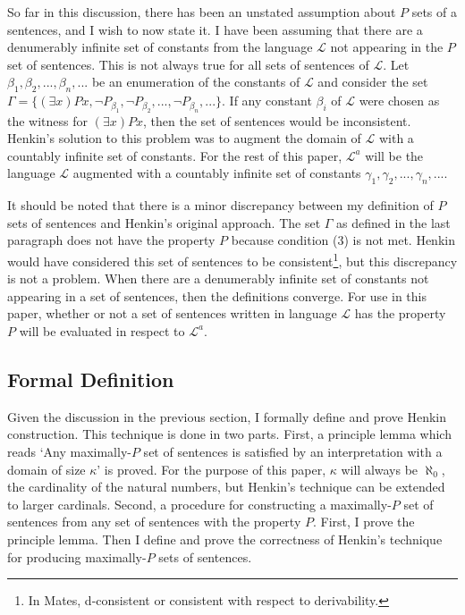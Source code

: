 \documentclass[12pt]{article}
\theoremstyle{definition}
\theoremstyle{remark}
\begin{document}
So far in this discussion, there has been an unstated assumption about $P$ sets of a sentences, and I wish to now state it. I have been assuming that there are a denumerably infinite set of constants from the language $\mathscr{L}$ not appearing in the $P$ set of sentences. This is not always true for all sets of sentences of $\mathscr{L}$. Let $\beta_1, \beta_2, ..., \beta_n, ...$ be an enumeration of the constants of $\mathscr{L}$ and consider the set $\Gamma = \{ (\exists x)Px, \neg P_{\beta_1}, \neg P_{\beta_2}, ..., \neg P_{\beta_n}, ... \}$. If any constant $\beta_i$ of $\mathscr{L}$ were chosen as the witness for $(\exists x)Px$, then the set of sentences would be inconsistent. Henkin's solution to this problem was to augment the domain of $\mathscr{L}$ with a countably infinite set of constants. For the rest of this paper, $\mathscr{L}^a$ will be the language $\mathscr{L}$ augmented with a countably infinite set of constants $\gamma_1, \gamma_2, ..., \gamma_n, ...$. 

It should be noted that there is a minor discrepancy between my definition of $P$ sets of sentences and Henkin's original approach. The set $\Gamma$ as defined in the last paragraph does not have the property $P$ because condition (3) is not met. Henkin would have considered this set of sentences to be consistent\footnote{In Mates, d-consistent or consistent with respect to derivability.}, but this discrepancy is not a problem. When there are a denumerably infinite set of constants not appearing in a set of sentences, then the definitions converge. For use in this paper, whether or not a set of sentences written in language $\mathscr{L}$ has the property $P$ will be evaluated in respect to $\mathscr{L}^a$.

\subsection{Formal Definition}

Given the discussion in the previous section, I formally define and prove Henkin construction. This technique is done in two parts. First, a principle lemma which reads `Any maximally-$P$ set of sentences is satisfied by an interpretation with a domain of size $\kappa$' is proved. For the purpose of this paper, $\kappa$ will always be $\aleph_0$, the cardinality of the natural numbers, but Henkin's technique can be extended to larger cardinals\cite{henkin_cardinals}. Second, a procedure for constructing a maximally-$P$ set of sentences from any set of sentences with the property $P$. First, I prove the principle lemma. Then I define and prove the correctness of Henkin's technique for producing maximally-$P$ sets of sentences.
\end{document}
